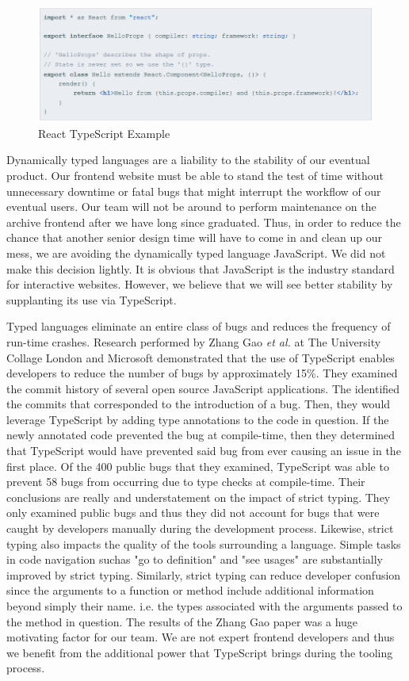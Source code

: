 \documentclass[12pt]{report}
\begin{document}
\begin{enumerate}
\begin{figure}[h]
	\centering
	\includegraphics[scale=0.5]{react_typescript_example}
	\caption{React TypeScript Example}
	\label{fig:reacttypescriptexample}
\end{figure}

Dynamically typed languages are a liability to the stability of our eventual product. Our frontend website must be able to stand the test of time without unnecessary downtime or fatal bugs that might interrupt the workflow of our eventual users. Our team will not be around to perform maintenance on the archive frontend after we have long since graduated. Thus, in order to reduce the chance that another senior design time will have to come in and clean up our mess, we are avoiding the dynamically typed language JavaScript. We did not make this decision lightly. It is obvious that JavaScript is the industry standard for interactive websites. However, we believe that we will see better stability by supplanting its use via TypeScript.

Typed languages eliminate an entire class of bugs and reduces the frequency of run-time crashes. Research performed by Zhang Gao \textit{et al.} at The University Collage London and Microsoft demonstrated that the use of TypeScript enables developers to reduce the number of bugs by approximately 15\%.\cite{typescriptpaper} They examined the commit history of several open source JavaScript applications. The identified the commits that corresponded to the introduction of a bug. Then, they would leverage TypeScript by adding type annotations to the code in question. If the newly annotated code prevented the bug at compile-time, then they determined that TypeScript would have prevented said bug from ever causing an issue in the first place. Of the 400 public bugs that they examined, TypeScript was able to prevent 58 bugs from occurring due to type checks at compile-time. Their conclusions are really and understatement on the impact of strict typing. They only examined public bugs and thus they did not account for bugs that were caught by developers manually during the development process. Likewise, strict typing also impacts the quality of the tools surrounding a language. Simple tasks in code navigation suchas "go to definition" and "see usages" are substantially improved by strict typing. Similarly, strict typing can reduce developer confusion since the arguments to a function or method include additional information beyond simply their name. i.e. the types associated with the arguments passed to the method in question. The results of the Zhang Gao paper was a huge motivating factor for our team. We are not expert frontend developers and thus we benefit from the additional power that TypeScript brings during the tooling process.


\end{enumerate}
\end{document}
